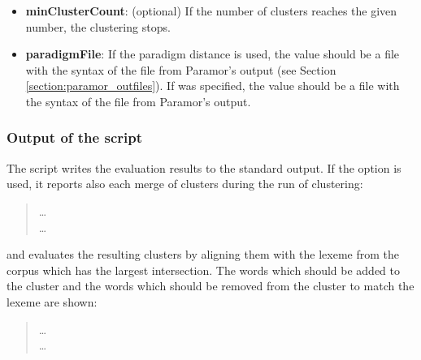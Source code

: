 \begin{itemize}
\item \textbf{minClusterCount}: (optional) If the number of clusters reaches the given number, the clustering stops.

\item \textbf{paradigmFile}: If the paradigm distance is used, the value should be a file with the syntax of the  file from Paramor's output (see Section \ref{section:paramor_outfiles}). If  was specified, the value should be a file with the syntax of the  file from Paramor's output.

\end{itemize}

\subsubsection{Output of the script}
The script  writes the evaluation results to the standard output. If the  option is used, it reports also each merge of clusters during the run of clustering:
\begin{quote}\begin{flushleft}
\ldots\\
\ldots
\end{flushleft}
\end{quote}
and evaluates the resulting clusters by aligning them with the lexeme from the corpus which has the largest intersection. The words which should be added to the cluster and the words which should be removed from the cluster to match the lexeme are shown:
\begin{quote}\begin{flushleft}
\ldots\\
\ldots
\end{flushleft}
\end{quote}

